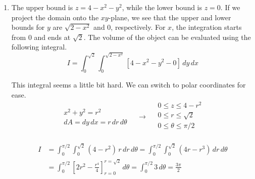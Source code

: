 \documentclass[a4paper, 12pt]{article}
\begin{document}
\begin{enumerate}[leftmargin=*,label=\textbf{\arabic*.}]
\begin{center}
\end{center}

\vspace{-1em}
Let $A$ be the area.
\begin{align*}
A&=\int_{-\pi/3}^{\pi/3}\int_{2-\cos\theta}^{1+\cos\theta}\,r\,dr\,d\theta=\frac12\int_{-\pi/3}^{\pi/3}\left[(1+\cos\theta)^2-(2-\cos\theta)^2\right]d\theta\\[1em]&=\frac12\int_{-\pi/3}^{\pi/3}\left[1+2\cos\theta+\cos^2\theta-\left(4-4\cos\theta+\cos^2\theta\right)\right]d\theta=\frac12\int_{-\pi/3}^{\pi/3}\left(6\cos\theta-3\right)d\theta \\[1em]&=\frac12\bigg[6\sin\theta-3\theta\bigg]_{-\pi/3}^{\pi/3}=\frac12\left[6\sin\frac\pi3-3\cdot\frac\pi3-\left(6\sin\left(-\frac\pi3\right)+3\cdot\frac{\pi}3 \right)\right]=\boxed{3\sqrt3-\pi}
\end{align*}

\item The upper bound is $z=4-x^2-y^2$, while the lower bound is $z=0$. If we project the domain onto the $xy$-plane, we see that the upper and lower bounds for $y$ are $\sqrt{2-x^2}$ and $0$, respectively. For $x$, the integration starts from $0$ and ends at $\sqrt2$. The volume of the object can be evaluated using the following integral.
\[{I}=\int_0^{\sqrt2}\int_0^{\sqrt{2-x^2}}\left[4-x^2-y^2-0 \right]\,dy\,dx\]

This integral seems a little bit hard. We can switch to polar coordinates for ease.
\[
\begin{array}{c}
x^2+y^2=r^2\\
dA=dy\,dx =r\,dr\,d\theta
\end{array}\quad\rightarrow\quad
\begin{array}{c}
0\leq z\leq4-r^2\\
0\leq r\leq \sqrt2\\
0\leq\theta\leq \pi/2\\
\end{array}
\]

\vspace{-1em}
\begin{align*}{I}&=\int_{0}^{\pi/2}\int_{0}^{\sqrt{2}}\left(4-r^2\right)\,r\,dr\,d\theta=\int_{0}^{\pi/2}\int_{0}^{\sqrt{2}}\left(4r-r^3\right)\,dr\,d\theta\\[1em]&=\int_{0}^{\pi/2}\left[2r^2-\frac{r^4}4\right]_{r=0}^{r=\sqrt2}\,d\theta=\int_0^{\pi/2}3\,d\theta=\boxed{\frac{3\pi}2}
\end{align*}


\end{enumerate}
\end{document}
